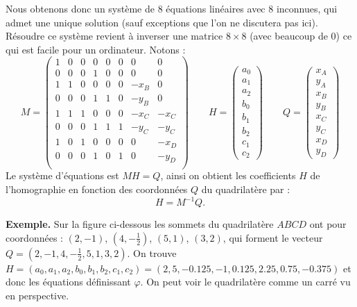 \documentclass[11pt,class=report,crop=false]{standalone}
\begin{document}
Nous obtenons donc un système de $8$ équations linéaires avec $8$ inconnues, qui admet une unique solution (sauf exceptions que l'on ne discutera pas ici). Résoudre ce système revient à inverser une matrice $8\times8$ (avec beaucoup de $0$) ce qui est facile pour un ordinateur.
Notons :
$$M = \begin{pmatrix}
1 & 0 & 0 & 0 & 0 & 0 & 0 & 0 \\
0 & 0 & 0 & 1 & 0 & 0 & 0 & 0 \\
1 & 1 & 0 & 0 & 0 & 0 & -x_B & 0 \\
0 & 0 & 0 & 1 & 1 & 0 & -y_B & 0 \\
1 & 1 & 1 & 0 & 0 & 0 & -x_C & -x_C \\
0 & 0 & 0 & 1 & 1 & 1 & -y_C & -y_C \\
1 & 0 & 1 & 0 & 0 & 0 & 0 & -x_D \\
0 & 0 & 0 & 1 & 0 & 1 & 0 & -y_D \\	
\end{pmatrix}
\qquad 
H = \begin{pmatrix}
a_0 \\ a_1 \\ a_2 \\ b_0 \\ b_1 \\ b_2 \\ c_1 \\ c_2	
\end{pmatrix}
\qquad
Q = \begin{pmatrix}
x_A \\ y_A \\ x_B \\ y_B \\ x_C \\ y_C \\ x_D \\ y_D 	
\end{pmatrix}
$$
Le système d'équations est $MH = Q$, ainsi on obtient les coefficients $H$ de l'homographie en fonction des coordonnées $Q$ du quadrilatère par :
$$H = M^{-1} Q.$$


\medskip
\textbf{Exemple.}
Sur la figure ci-dessous les sommets du quadrilatère $ABCD$ ont pour coordonnées :
$(2,-1)$, $(4,-\frac12)$, $(5,1)$, $(3,2)$, qui forment le vecteur 
$Q = (2,-1, 4,-\frac12, 5,1, 3,2)$.
On trouve $H = (a_0, a_1, a_2, b_0, b_1, b_2, c_1, c_2) = (2, 5, -0.125, -1, 0.125,  2.25, 0.75, -0.375)$ et donc les équations définissant $\varphi$. 
On peut voir le quadrilatère comme un carré vu en perspective.
 
\end{document}
